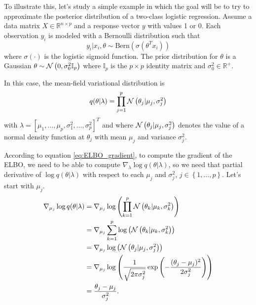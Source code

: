 To illustrate this, let's study a simple example in which the goal will be to try to approximate the posterior distribution of a two-class logistic regression. Assume a data matrix $X \in \mathbb{R}^{n \times p}$ and a response vector $y$ with values 1 or 0. Each observation $y_i$ is modeled with a Bernoulli distribution such that
\begin{equation}
  y_i | x_i, \theta \sim \mathrm{Bern}(\sigma(\theta^T x_i))
\end{equation}
where $\sigma(\cdot)$ is the logistic sigmoid function. The prior distribution for $\theta$ is a Gaussian $\theta \sim \mathcal{N}\left( 0, \sigma_0^2 \mathbb{I}_p \right)$ where $\mathbb{I}_p$ is the $p \times p$ identity matrix and $\sigma_0^2 \in \mathbb{R}^+$.

In this case, the mean-field variational distribution is
\begin{equation}
  \label{eq:mean_field_normal_prior}
  q(\theta | \lambda) = \prod_{j = 1}^p \mathcal{N}\left( \theta_j | \mu_j, \sigma_j^2 \right)
 \end{equation}
with $\lambda = \left[ \mu_1, \hdots, \mu_p, \sigma_1^2, \hdots, \sigma_p^2 \right]^T$ and where $\mathcal{N}\left( \theta_j | \mu_j, \sigma_j^2 \right)$ denotes the value of a normal density function at $\theta_j$ with mean $\mu_j$ and variance $\sigma_j^2$.

According to equation \ref{eq:ELBO_gradient}, to compute the gradient of the ELBO, we need to be able to compute $\nabla_{\lambda} \log q(\theta | \lambda)$, so we need that partial derivative of $\log q(\theta | \lambda)$ with respect to each $\mu_j$ and $\sigma_j^2$, $j \in \left\{ 1, \hdots, p \right\}$. Let's start with $\mu_j$.
\begin{equation}
  \begin{split}
      \nabla_{\mu_j} \log q(\theta | \lambda) & =
      \nabla_{\mu_j} \log \left( \prod_{ k = 1}^p \mathcal{N}\left( \theta_k | \mu_k, \sigma_k^2 \right) \right) \\
      &= \nabla_{\mu_j} \sum_{ k = 1}^p \log \left( \mathcal{N}\left( \theta_k | \mu_k, \sigma_k^2 \right) \right) \\
      &= \nabla_{\mu_j} \log \left( \mathcal{N}\left( \theta_j | \mu_j, \sigma_j^2 \right) \right) \\
      &= \nabla_{\mu_j} \log \left( \frac{1}{\sqrt{2 \pi \sigma_j^2}} \exp \left( -\frac{(\theta_j - \mu_j)^2}{2 \sigma_j^2} \right) \right) \\
      &= \frac{\theta_j - \mu_j}{\sigma_j^2}.
  \end{split}
\end{equation}

